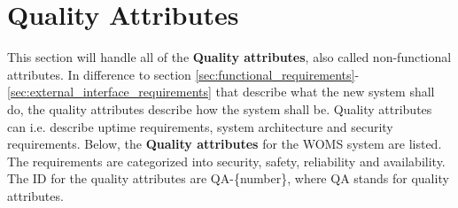 \section{Quality Attributes} 
\label{sec:quality_attributes}

This section will handle all of the \textbf{Quality attributes}, also called non-functional attributes.  In difference to section \ref{sec:functional_requirements}-\ref{sec:external_interface_requirements} that describe what the new system shall do, the quality attributes describe how the system shall be. \cite{idi.ntnu}  Quality attributes can i.e. describe uptime requirements, system architecture and security requirements.
Below, the \textbf{Quality attributes} for the WOMS system are listed. The requirements are categorized into security, safety, reliability and availability. The ID for the quality attributes are QA-\{number\}, where QA stands for quality attributes.


